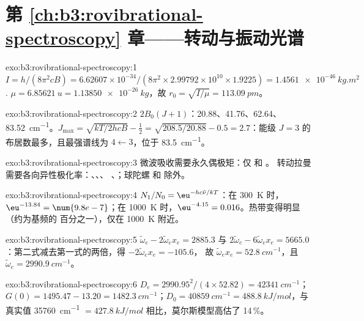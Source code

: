 \section*{第 \ref{ch:b3:rovibrational-spectroscopy} 章——转动与振动光谱}

\begin{solution}{exo:b3:rovibrational-spectroscopy:1}
$I = h/(8\pi^2cB) = 6.62607 \times 10^{-34}/(8\pi^2 \times 2.99792 \times 10^{10} \times
1.9225) = \qty{1.4561e-46}{kg.m^2}$. $\mu = \qty{6.85621}{u} = \qty{1.13850e-26}{kg}$，故
$r_0 = \sqrt{I/\mu} = \qty{113.09}{pm}$。
\end{solution}

\begin{solution}{exo:b3:rovibrational-spectroscopy:2}
$2B_0(J+1)$：20.88、41.76、62.64、\qty{83.52}{cm^{-1}}。$J_{\max} = \sqrt{kT/2hcB} -
\frac12 = \sqrt{208.5/20.88} - 0.5 = 2.7$：能级 $J = 3$ 的
布居数最多，且最强谱线为 $4 \leftarrow 3$，位于 \qty{83.5}{cm^{-1}}。
\end{solution}

\begin{solution}{exo:b3:rovibrational-spectroscopy:3}
微波吸收需要永久偶极矩：仅  和 。
转动拉曼需要各向异性极化率：、、、
、；球陀螺  和  除外。
\end{solution}

\begin{solution}{exo:b3:rovibrational-spectroscopy:4}
$N_1/N_0 = \eu^{-hc\tilde\nu/kT}$：在 \qty{300}{K} 时，$\eu^{-13.84} = \num{9.8e-7}$；在
\qty{1000}{K} 时，$\eu^{-4.15} = 0.016$。热带变得明显（约为基频的
百分之一），仅在 \qty{1000}{K} 附近。
\end{solution}

\begin{solution}{exo:b3:rovibrational-spectroscopy:5}
$\tilde\omega_e - 2\tilde\omega_ex_e = 2885.3$ 与 $2\tilde\omega_e - 6\tilde\omega_ex_e =
5665.0$：第二式减去第一式的两倍，得 $-2\tilde\omega_ex_e = -105.6$，
故 $\tilde\omega_ex_e = \qty{52.8}{cm^{-1}}$，且 $\tilde\omega_e = \qty{2990.9}{cm^{-1}}$。
\end{solution}

\begin{solution}{exo:b3:rovibrational-spectroscopy:6}
$D_e = 2990.95^2/(4 \times 52.82) = \qty{42341}{cm^{-1}}$；$G(0) = 1495.47 - 13.20 =
\qty{1482.3}{cm^{-1}}$；$D_0 = \qty{40859}{cm^{-1}} = \qty{488.8}{kJ/mol}$，与真实值
\qty{35760}{cm^{-1}} $= \qty{427.8}{kJ/mol}$ 相比，莫尔斯模型高估了 14\,\%。
\end{solution}

